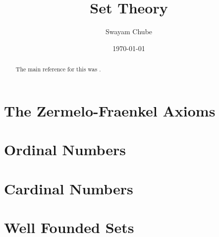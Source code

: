 \documentclass[oneside,a4paper]{report}
\title{Set Theory}
\author{Swayam Chube}
\date{\today}
\begin{document}
\maketitle

\begin{abstract}
    The main reference for this was \cite{kunen}.
\end{abstract}

\tableofcontents

\chapter{The Zermelo-Fraenkel Axioms}


\chapter{Ordinal Numbers}


\chapter{Cardinal Numbers}


\chapter{Well Founded Sets}




\end{document}

